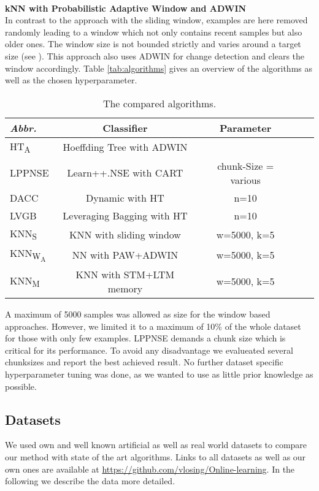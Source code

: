 \documentclass[conference]{IEEEtran}
\begin{document}
\\\textbf{kNN with Probabilistic Adaptive Window and ADWIN}\\
In contrast to the approach with the sliding window, examples are here removed randomly leading to a window which not only contains recent samples but also older ones. The window size is not bounded strictly
and varies around a target size (see \cite{Bifet:2013:EDS:2480362.2480516}). This approach also uses ADWIN for change detection and clears the window accordingly.
Table \ref{tab:algorithms} gives an overview of the algorithms as well as the chosen hyperparameter. 
\begin{table}
\def\arraystretch{0.9}
\footnotesize
\centering
\caption{The compared algorithms.}
\label{tab:algorithms}
\begin{tabular}{l|cccc}
\textit{Abbr.} & Classifier & Parameter\\\hline
HT\textsubscript{A} & Hoeffding Tree with ADWIN \\
LPPNSE & Learn++.NSE with CART& chunk-Size = various\\
DACC & Dynamic with HT& n=10\\
LVGB & Leveraging Bagging with HT& n=10\\
KNN\textsubscript{S} & KNN with sliding window & w=5000, k=5\\
KNN\textsubscript{W\textsubscript{A}} & NN with PAW+ADWIN& w=5000, k=5\\
KNN\textsubscript{M} &KNN with STM+LTM memory & w=5000, k=5\\
\end{tabular}
\label{tab:artDatasets}
\end{table}
A maximum of 5000 samples was allowed as size for the window based approaches. However,
we limited it to a maximum of 10\% of the whole dataset for those with only few examples. LPPNSE demands a chunk size which is critical for its performance. To avoid any disadvantage 
we evalueated several chunksizes and report the best achieved result. No further dataset specific hyperparameter tuning was done, as we wanted to use as little prior knowledge as possible.


\subsection{Datasets}
We used own and well known artificial as well as real world datasets to compare our method with state of the art algorithms. 
Links to all datasets as well as our own ones are available at \url{https://github.com/vlosing/Online-learning}. In the following we describe the data more detailed.\\
\end{document}
